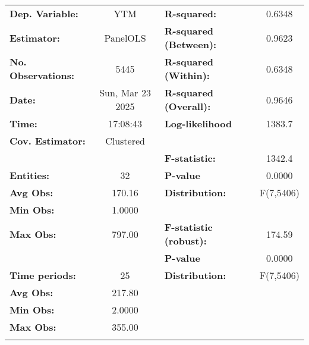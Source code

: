 \begin{center}
\begin{tabular}{lclc}
\toprule
\textbf{Dep. Variable:}     &        YTM         & \textbf{  R-squared:         }   &      0.6348      \\
\textbf{Estimator:}         &      PanelOLS      & \textbf{  R-squared (Between):}  &      0.9623      \\
\textbf{No. Observations:}  &        5445        & \textbf{  R-squared (Within):}   &      0.6348      \\
\textbf{Date:}              &  Sun, Mar 23 2025  & \textbf{  R-squared (Overall):}  &      0.9646      \\
\textbf{Time:}              &      17:08:43      & \textbf{  Log-likelihood     }   &      1383.7      \\
\textbf{Cov. Estimator:}    &     Clustered      & \textbf{                     }   &                  \\
\textbf{}                   &                    & \textbf{  F-statistic:       }   &      1342.4      \\
\textbf{Entities:}          &         32         & \textbf{  P-value            }   &      0.0000      \\
\textbf{Avg Obs:}           &       170.16       & \textbf{  Distribution:      }   &    F(7,5406)     \\
\textbf{Min Obs:}           &       1.0000       & \textbf{                     }   &                  \\
\textbf{Max Obs:}           &       797.00       & \textbf{  F-statistic (robust):} &      174.59      \\
\textbf{}                   &                    & \textbf{  P-value            }   &      0.0000      \\
\textbf{Time periods:}      &         25         & \textbf{  Distribution:      }   &    F(7,5406)     \\
\textbf{Avg Obs:}           &       217.80       & \textbf{                     }   &                  \\
\textbf{Min Obs:}           &       2.0000       & \textbf{                     }   &                  \\
\textbf{Max Obs:}           &       355.00       & \textbf{                     }   &                  \\
\textbf{}                   &                    & \textbf{                     }   &                  \\

\end{tabular}
\end{center}
